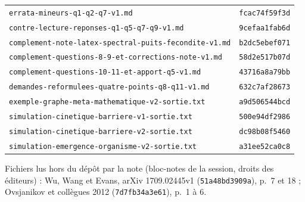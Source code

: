 \documentclass[11pt,a4paper]{article}
\theoremstyle{definition}
\theoremstyle{plain}
\newcommand{\chemin}[1]{\nolinkurl{#1}}
\begin{document}
\begin{small}
\begin{longtable}{@{}p{}l@{}}
\chemin{errata-mineurs-q1-q2-q7-v1.md} & \texttt{fcac74f59f3d} \\
\chemin{contre-lecture-reponses-q1-q5-q7-q9-v1.md} & \texttt{9cefaa1fab6d} \\
\chemin{complement-note-latex-spectral-puits-fecondite-v1.md} & \texttt{b2dc5ebef071} \\
\chemin{complement-questions-8-9-et-corrections-note-v1.md} & \texttt{58d2e517b07d} \\
\chemin{complement-questions-10-11-et-apport-q5-v1.md} & \texttt{43716a8a79bb} \\
\chemin{demandes-reformulees-quatre-points-q8-q11-v1.md} & \texttt{632c7af28673} \\
\chemin{exemple-graphe-meta-mathematique-v2-sortie.txt} & \texttt{a9d506544bcd} \\
\chemin{simulation-cinetique-barriere-v1-sortie.txt} & \texttt{500e94df2986} \\
\chemin{simulation-cinetique-barriere-v2-sortie.txt} & \texttt{dc98b08f5460} \\
\chemin{simulation-emergence-organisme-v2-sortie.txt} & \texttt{a31ee52ca0c8} \\
\bottomrule
\end{longtable}
\end{small}

Fichiers lus hors du dépôt par la note (bloc-notes de la session, droits des éditeurs) : Wu, Wang et
Evans, arXiv 1709.02445v1 (\texttt{51a48bd3909a}), p.~7 et 18 ; Ovsjanikov et collègues 2012
(\texttt{7d7fb34a3e61}), p.~1 à 6.
\end{document}
